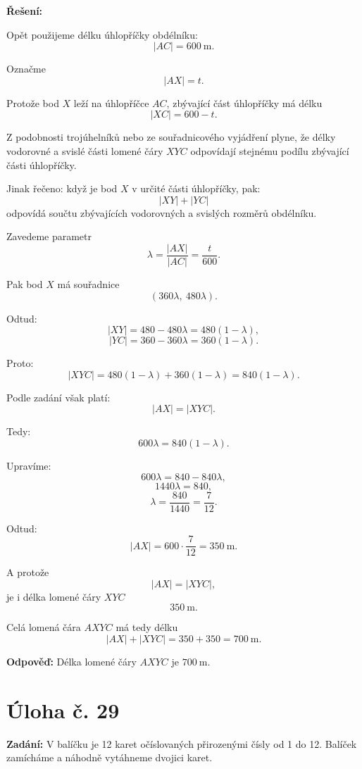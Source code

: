 \documentclass[12pt,a4paper]{article}
\begin{document}
\textbf{Řešení:}

Opět použijeme délku úhlopříčky obdélníku:
\[
|AC|=600\ \mathrm{m}.
\]

Označme
\[
|AX|=t.
\]

Protože bod \(X\) leží na úhlopříčce \(AC\), zbývající část úhlopříčky má délku
\[
|XC|=600-t.
\]

Z podobnosti trojúhelníků nebo ze souřadnicového vyjádření plyne, že délky vodorovné a svislé části lomené čáry \(XYC\) odpovídají stejnému podílu zbývající části úhlopříčky.

Jinak řečeno: když je bod \(X\) v určité části úhlopříčky, pak:
\[
|XY|+|YC|
\]
odpovídá součtu zbývajících vodorovných a svislých rozměrů obdélníku.

Zavedeme parametr
\[
\lambda=\frac{|AX|}{|AC|}=\frac{t}{600}.
\]

Pak bod \(X\) má souřadnice
\[
(360\lambda,\ 480\lambda).
\]

Odtud:
\[
|XY|=480-480\lambda=480(1-\lambda),
\]
\[
|YC|=360-360\lambda=360(1-\lambda).
\]

Proto:
\[
|XYC|=480(1-\lambda)+360(1-\lambda)=840(1-\lambda).
\]

Podle zadání však platí:
\[
|AX|=|XYC|.
\]

Tedy:
\[
600\lambda = 840(1-\lambda).
\]

Upravíme:
\[
600\lambda = 840-840\lambda,
\]
\[
1440\lambda = 840,
\]
\[
\lambda=\frac{840}{1440}=\frac{7}{12}.
\]

Odtud:
\[
|AX|=600\cdot \frac{7}{12}=350\ \mathrm{m}.
\]

A protože
\[
|AX|=|XYC|,
\]
je i délka lomené čáry \(XYC\)
\[
350\ \mathrm{m}.
\]

Celá lomená čára \(AXYC\) má tedy délku
\[
|AX|+|XYC|=350+350=700\ \mathrm{m}.
\]

\bigskip

\textbf{Odpověď:}  
Délka lomené čáry \(AXYC\) je \(700\ \mathrm{m}\).



\newpage
\section*{Úloha č. 29}

\textbf{Zadání:}  
V balíčku je 12 karet očíslovaných přirozenými čísly od 1 do 12.  
Balíček zamícháme a náhodně vytáhneme dvojici karet.
\end{document}
